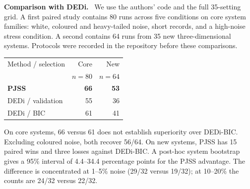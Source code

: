 \documentclass[letterpaper,10pt]{article}
\newcommand{\lead}[1]{\par\smallskip\noindent\textbf{#1}\ }
\begin{document}
\begin{minipage}[t]{0.478\textwidth}\vspace{0pt}
\lead{Comparison with DEDi.} We use the authors' code and the full 35-setting grid. A first paired study contains 80 runs across five conditions on core system families: white, coloured and heavy-tailed noise, short records, and a high-noise stress condition. A second contains 64 runs from 35 new three-dimensional systems. Protocols were recorded in the repository before these comparisons.

\begin{center}\small
\begin{tabular}{@{}lrr@{}}\toprule
Method / selection & Core & New\\
 & $n=80$ & $n=64$\\\midrule
\textbf{PJSS} & \textbf{66} & \textbf{53}\\
DEDi / validation & 55 & 36\\
DEDi / BIC & 61 & 41\\\bottomrule
\end{tabular}
\label{tab:dedi}
\end{center}

On core systems, 66 versus 61 does not establish superiority over DEDi-BIC. Excluding coloured noise, both recover 56/64. On new systems, PJSS has 15 paired wins and three losses against DEDi-BIC. A post-hoc system bootstrap gives a 95\% interval of 4.4--34.4 percentage points for the PJSS advantage. The difference is concentrated at 1--5\% noise (29/32 versus 19/32); at 10--20\% the counts are 24/32 versus 22/32.
\end{minipage}
\end{document}
